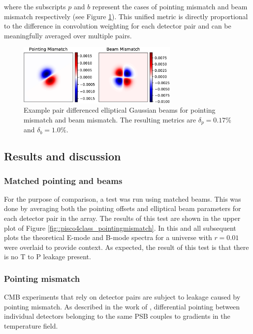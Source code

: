 \documentclass[a4paper,11pt]{article}
\begin{document}
\noindent
where the subscripts $p$ and $b$ represent the cases of pointing mismatch and beam mismatch respectively (see Figure \ref{fig::mismatch_metric}). This unified metric is directly proportional to the difference in convolution weighting for each detector pair and can be meaningfully averaged over multiple pairs. 

\begin{figure}
	\centering
	\includegraphics[width=0.7\textwidth]{figures/PairDiffSinglePair.pdf}
	\caption{Example pair differenced elliptical Gaussian beams for pointing mismatch and beam mismatch. The resulting metrics are $\delta_p = 0.17\%$ and $\delta_b = 1.0\%$.}
	\label{fig::mismatch_metric}
\end{figure}

\subsection{Results and discussion}

\subsubsection{Matched pointing and beams}

For the purpose of comparison, a test was run using matched beams. This was done by averaging both the pointing offsets and elliptical beam parameters for each detector pair in the array. The results of this test are shown in the upper plot of Figure \ref{fig::pisco4class_pointingmismatch}. In this and all subsequent plots the theoretical E-mode and B-mode spectra for a universe with $r=0.01$ were overlaid to provide context. As expected, the result of this test is that there is no T to P leakage present.   

\subsubsection{Pointing mismatch}

CMB experiments that rely on detector pairs are subject to leakage caused by pointing mismatch. As described in the work of \cite{2007MNRAS.376.1767O}, differential pointing between individual detectors belonging to the same PSB couples to gradients in the temperature field.
\end{document}
